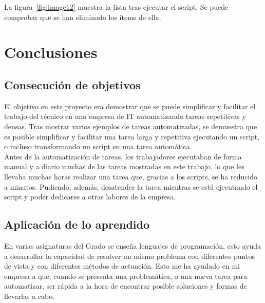 \documentclass[a4paper, 12pt]{book}
\begin{document}
\begin{itemize}
La figura~\ref{fig:image12} muestra la lista tras ejecutar el script. Se puede comprobar que se han eliminado los ítems de ella.

\end{itemize}



\cleardoublepage
\chapter{Conclusiones}
\label{chap:conclusiones}


\section{Consecución de objetivos}
\label{sec:consecucion-objetivos}

El objetivo en este proyecto era demostrar que se puede simplificar y facilitar el trabajo del técnico en una empresa de IT automatizando tareas repetitivas y densas. Tras mostrar varios ejemplos de tareas automatizadas, se demuestra que es posible simplificar y facilitar una tarea larga y repetitiva ejecutando un script, o incluso transformando un script en una tarea automática.
\\

Antes de la automatización de tareas, los trabajadores ejecutaban de forma manual y a diario muchas de las tareas mostradas en este trabajo, lo que les llevaba muchas horas realizar una tarea que, gracias a los scripts, se ha reducido a minutos. Pudiendo, además, desatender la tarea mientras se está ejecutando el script y poder dedicarse a otras labores de la empresa.


\section{Aplicación de lo aprendido}
\label{sec:aplicacion}

En varias asignaturas del Grado se enseña lenguajes de programación, esto ayuda a desarrollar la capacidad de resolver un mismo problema con diferentes puntos de vista y con diferentes métodos de actuación. Esto me ha ayudado en mi empresa a que, cuando se presenta una problemática, o una nueva tarea para automatizar, ser rápida a la hora de encontrar posible soluciones y formas de llevarlas a cabo.
\\
\end{document}
